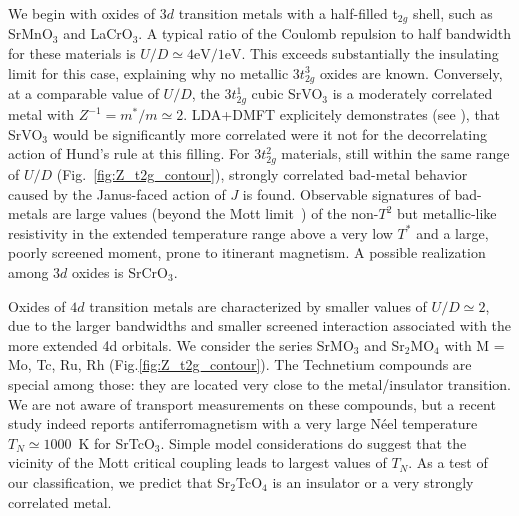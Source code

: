 \documentclass[aps,prl,amsmath, amssymb, english, aps, prl, onecolumn,
  reprint,floatfix, superscriptaddress]{revtex4-1}
\def\t2g{t${}_{2g}$}
\begin{document}
We begin with oxides of $3d$ transition metals with a half-filled \t2g
shell, such as SrMnO$_3$ and LaCrO$_3$.  A typical ratio of the
Coulomb repulsion to half bandwidth for these materials is $U/D\simeq
4\mathrm{eV}/1\mathrm{eV}$.  This exceeds substantially the insulating
limit for this case, explaining why no metallic $3t_{2g}^3$ oxides are
known\cite{imada_mit_review, Torrance_why}.  Conversely, at a
comparable value of $U/D$, the $3t_{2g}^1$ cubic SrVO$_3$ is a
moderately correlated metal with $Z^{-1}=m^*/m\simeq
2$\cite{imada_mit_review}.  LDA+DMFT explicitely demonstrates (see
\cite{Janus_Supp}), that SrVO$_3$ would be significantly more
correlated\cite{werner09} were it not for the decorrelating action of
Hund's rule at this filling.  For $3t_{2g}^2$ materials, still within
the same range of $U/D$ (Fig.~\ref{fig:Z_t2g_contour}), strongly
correlated bad-metal behavior caused by the Janus-faced action of $J$
is found.  Observable signatures of bad-metals are large values (beyond the Mott limit~\cite{emery_kivelson_badmetals}) of the
non-$T^2$ but metallic-like resistivity in the extended temperature
range above a very low $T^*$ and a large, poorly screened moment, prone
to itinerant magnetism.  A possible realization among $3d$ oxides is
SrCrO$_3$\cite{chamberland67,zhou06}.

Oxides of $4d$ transition metals are characterized by smaller values of 
$U/D\simeq 2$,  due to the larger bandwidths and smaller screened interaction 
associated with the more extended 4d orbitals. 
We consider the series SrMO$_3$ and Sr$_2$MO$_4$ with 
M = {Mo, Tc, Ru, Rh} (Fig.\ref{fig:Z_t2g_contour}). 
The Technetium compounds are special among those: they are located
very close to the metal/insulator transition.  We are not aware of
transport measurements on these compounds, but a recent
study\cite{rodriguez11} indeed reports antiferromagnetism with a very
large N\'eel temperature $T_N\simeq 1000$~K for SrTcO$_3$.  
%
Simple model considerations do suggest that the vicinity of the 
Mott critical coupling leads to largest values of $T_N$. 
%
As a test of our classification, we predict that Sr$_2$TcO$_4$ %
is an insulator or
a very strongly correlated metal.
%
\end{document}
